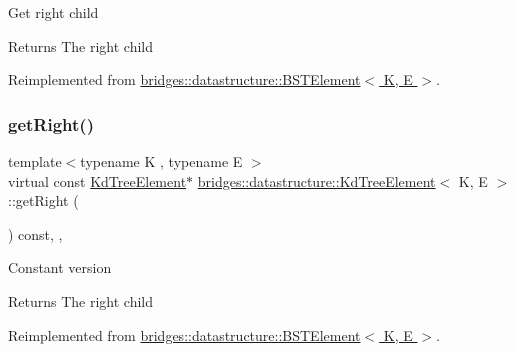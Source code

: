 Get right child \begin{DoxyReturn}{Returns}
The right child 
\end{DoxyReturn}


Reimplemented from \hyperlink{classbridges_1_1datastructure_1_1_b_s_t_element_a80f5085d6d03805dd3091b7693d8e235}{bridges\+::datastructure\+::\+B\+S\+T\+Element$<$ K, E $>$}.

\mbox{\label{classbridges_1_1datastructure_1_1_kd_tree_element_ae8d6007d3848b72cbfc11d2e29120781}} 
\subsubsection{\texorpdfstring{get\+Right()}{getRight()}\hspace{0.1cm}{\footnotesize\ttfamily [2/2]}}
{\footnotesize\ttfamily template$<$typename K , typename E $>$ \\
virtual const \hyperlink{classbridges_1_1datastructure_1_1_kd_tree_element}{Kd\+Tree\+Element}$\ast$ \hyperlink{classbridges_1_1datastructure_1_1_kd_tree_element}{bridges\+::datastructure\+::\+Kd\+Tree\+Element}$<$ K, E $>$\+::get\+Right (\begin{DoxyParamCaption}{ }\end{DoxyParamCaption}) const\hspace{0.3cm}{\ttfamily [inline]}, {\ttfamily [override]}, {\ttfamily [virtual]}}

Constant version

\begin{DoxyReturn}{Returns}
The right child 
\end{DoxyReturn}


Reimplemented from \hyperlink{classbridges_1_1datastructure_1_1_b_s_t_element_a012f0eb09c3d62b14c73109e6ded0879}{bridges\+::datastructure\+::\+B\+S\+T\+Element$<$ K, E $>$}.

\mbox{\label{classbridges_1_1datastructure_1_1_kd_tree_element_a9862bde7b85254224963e23dd9bcee29}} 
